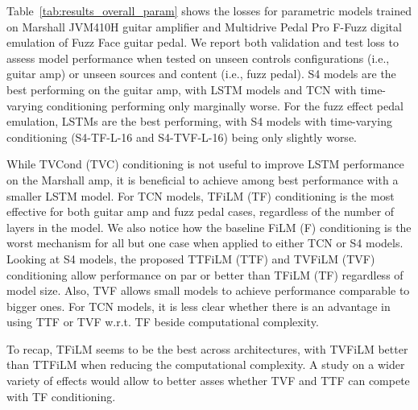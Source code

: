 Table~\ref{tab:results_overall_param} shows the losses for parametric models trained on Marshall JVM410H guitar amplifier and Multidrive Pedal Pro F-Fuzz digital emulation of Fuzz Face guitar pedal.
We report both validation and test loss to assess model performance when tested on unseen controls configurations (i.e., guitar amp) or unseen sources and content (i.e., fuzz pedal).
S4 models are the best performing on the guitar amp, with LSTM models and TCN with time-varying conditioning performing only marginally worse.
For the fuzz effect pedal emulation, LSTMs are the best performing, with S4 models with time-varying conditioning (S4-TF-L-16 and S4-TVF-L-16) being only slightly worse.

While TVCond (TVC) conditioning is not useful to improve LSTM performance on the Marshall amp, it is beneficial to achieve among best performance with a smaller LSTM model.
For TCN models, TFiLM (TF) conditioning is the most effective for both guitar amp and fuzz pedal cases, regardless of the number of layers in the model.
We also notice how the baseline FiLM (F) conditioning is the worst mechanism for all but one case when applied to either TCN or S4 models.
Looking at S4 models, the proposed TTFiLM (TTF) and TVFiLM (TVF) conditioning allow performance on par or better than TFiLM (TF) regardless of model size.
Also, TVF allows small models to achieve performance comparable to bigger ones.
For TCN models, it is less clear whether there is an advantage in using TTF or TVF w.r.t. TF beside computational complexity.

To recap, TFiLM seems to be the best across architectures, with TVFiLM better than TTFiLM when reducing the computational complexity.
A study on a wider variety of effects would allow to better asses whether TVF and TTF can compete with TF conditioning.


